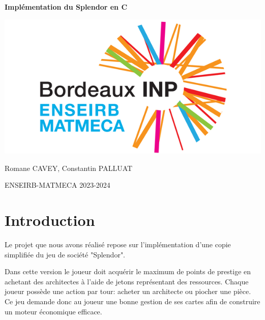 \documentclass{article}
\begin{document}
\begin{titlepage}
    \centering
    \Huge\bfseries
    Implémentation du Splendor en C

    \begin{center}
    \includegraphics[scale=2]{enseirb.png}
    \centering
    \end{center}
    
    \vspace{5cm}

    \Large
    Romane CAVEY, Constantin PALLUAT
    
    \vspace{1cm} 
    
    
    \Large
    ENSEIRB-MATMECA 2023-2024
    
    \vspace{0.5cm} 

    
    \vfill %
    
   
\end{titlepage}

\tableofcontents

\newpage

\section{Introduction}

\hspace{1em} Le projet que nous avons réalisé repose sur l'implémentation d'une copie simplifiée du jeu de société "Splendor". 

\vspace{1em} Dans cette version le joueur doit acquérir le maximum de points de prestige en achetant des architectes à l'aide de jetons représentant des ressources. Chaque joueur possède une action par tour: acheter un architecte ou piocher une pièce. Ce jeu demande donc au joueur une bonne gestion de ses cartes afin de construire un moteur économique efficace.
\end{document}
